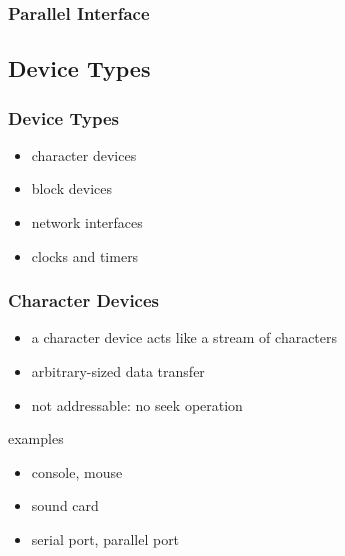 \documentclass[dvipsnames]{beamer}
\begin{document}
\begin{frame}
  \frametitle{Parallel Interface}

  \begin{center}
  \end{center}
\end{frame}

\subsection{Device Types}

\begin{frame}
  \frametitle{Device Types}

  \begin{itemize}
    \item character devices
    \item block devices
    \item network interfaces
    \item clocks and timers
  \end{itemize}
\end{frame}

\begin{frame}
  \frametitle{Character Devices}

  \begin{itemize}
    \item a character device acts like a stream of characters

    \medskip
    \item arbitrary-sized data transfer
    \item not addressable: no seek operation
  \end{itemize}

  \begin{exampleblock}{examples}
    \begin{itemize}
      \item console, mouse
      \item sound card
      \item serial port, parallel port
    \end{itemize}
  \end{exampleblock}
\end{frame}
\end{document}
